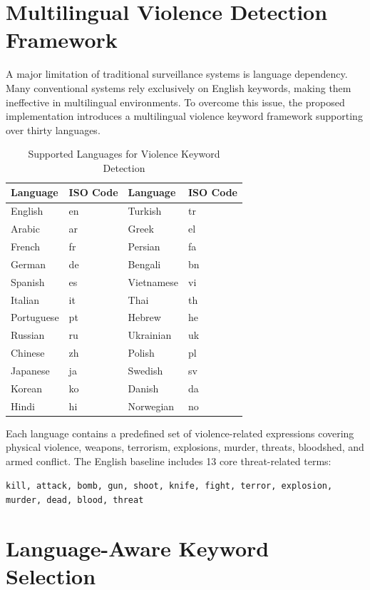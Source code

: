 \documentclass[12pt]{report}
\begin{document}
\section{Multilingual Violence Detection Framework}

A major limitation of traditional surveillance systems is language dependency. Many conventional systems rely exclusively on English keywords, making them ineffective in multilingual environments. To overcome this issue, the proposed implementation introduces a multilingual violence keyword framework supporting over thirty languages.

\begin{table}[H]
\centering
\begin{tabular}{|l|l|l|l|}
\hline
\textbf{Language} & \textbf{ISO Code} & \textbf{Language} & \textbf{ISO Code} \\
\hline
English & en & Turkish & tr \\
\hline
Arabic & ar & Greek & el \\
\hline
French & fr & Persian & fa \\
\hline
German & de & Bengali & bn \\
\hline
Spanish & es & Vietnamese & vi \\
\hline
Italian & it & Thai & th \\
\hline
Portuguese & pt & Hebrew & he \\
\hline
Russian & ru & Ukrainian & uk \\
\hline
Chinese & zh & Polish & pl \\
\hline
Japanese & ja & Swedish & sv \\
\hline
Korean & ko & Danish & da \\
\hline
Hindi & hi & Norwegian & no \\
\hline
\end{tabular}
\caption{Supported Languages for Violence Keyword Detection}
\end{table}

Each language contains a predefined set of violence-related expressions covering physical violence, weapons, terrorism, explosions, murder, threats, bloodshed, and armed conflict. The English baseline includes 13 core threat-related terms:
\begin{center}
\texttt{kill, attack, bomb, gun, shoot, knife, fight, terror, explosion, murder, dead, blood, threat}
\end{center}

\section{Language-Aware Keyword Selection}
\end{document}
